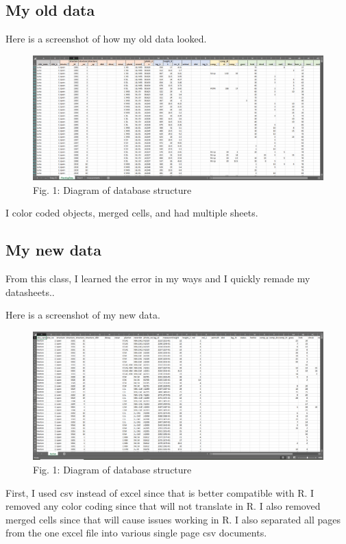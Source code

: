 \documentclass[
]{book}
\begin{document}
\hypertarget{my-old-data}{%
\subsection{My old data}\label{my-old-data}}

Here is a screenshot of how my old data looked.

\begin{figure}
\centering
\includegraphics{old_data.png}
\caption{Fig. 1: Diagram of database structure}
\end{figure}

I color coded objects, merged cells, and had multiple sheets.

\hypertarget{my-new-data}{%
\subsection{My new data}\label{my-new-data}}

From this class, I learned the error in my ways and I quickly remade my
datasheets..

Here is a screenshot of my new data.

\begin{figure}
\centering
\includegraphics{new_data.png}
\caption{Fig. 1: Diagram of database structure}
\end{figure}

First, I used csv instead of excel since that is better compatible with R.
I removed any color coding since that will not translate in R. I also removed
merged cells since that will cause issues working in R. I also separated all
pages from the one excel file into various single page csv documents.
\end{document}

